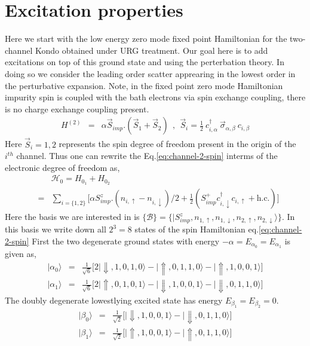 \documentclass[reprint,prb,superscriptaddress]{revtex4-1}
\begin{document}
\section{Excitation properties}
Here we start with the low energy zero mode fixed point Hamiltonian for the two-channel Kondo obtained under URG treatment. Our goal here is to add excitations on top of this ground state and using the perterbation theory. In doing so we consider the leading order scatter apprearing in the lowest order in the perturbative expansion. Note, in the fixed point zero mode Hamiltonian impurity spin is coupled with the bath electrons via spin exchange coupling, there is no charge exchange coupling present. 
\begin{eqnarray}
H^{(2)}&=& \alpha \vec{S}_{imp}.(\vec{S}_1+\vec{S}_2)~~,~~\vec{S}_i =  \frac{1}{2}~ c_{i,\alpha}^{\dagger}~ \vec{\sigma}_{\alpha,\beta}~ c_{i,\beta}
\label{eq:channel-2-spin}
\end{eqnarray}
Here $\vec{S}_i=1,2$ represents the spin degree of freedom present in the origin of the $i^{th}$ channel. Thus one can rewrite the Eq.\eqref{eq:channel-2-spin} interms of the electronic degree of freedom as,
\begin{eqnarray}
&&\mathcal{H}_0= H_{0_1}+H_{0_2} \nonumber\\
&=&\sum_{i=\{1,2\}}\bigg[ \alpha S^z_{imp}. (n_{i,\uparrow}-n_{i,\downarrow})/2 + \frac{1}{2}  ( S_{imp}^{+} c^{\dagger}_{i,\downarrow} c_{i,\uparrow} + \textrm{h.c.}  )\nonumber \bigg]
\end{eqnarray}
Here the basis we are interested in is $\{\mathcal{B}\}=\{|S^z_{imp},n_{1,\uparrow},n_{1,\downarrow},n_{2,\uparrow},n_{2,\downarrow}\rangle \}$. In this basis we write down all $2^3=8$ states of the spin Hamiltonian eq.\eqref{eq:channel-2-spin}
First the two degenerate ground states with energy $-\alpha= E_{\alpha_0}= E_{\alpha_1}$ is given as,
\begin{eqnarray}
|\alpha_0\rangle &=& \frac{1}{\sqrt{6}} \bigg[2|\Downarrow,1,0,1,0\rangle-|\Uparrow,0,1,1,0\rangle-|\Uparrow,1,0,0,1\rangle\bigg] \nonumber\\
|\alpha_1\rangle &=& \frac{1}{\sqrt{6}} \bigg[2|\Uparrow,0,1,0,1\rangle-|\Downarrow,1,0,0,1\rangle-|\Downarrow,0,1,1,0\rangle\bigg] \nonumber
\end{eqnarray}
The doubly degenerate lowestlying excited state has energy $E_{\beta_1}=E_{\beta_2}=0$.
\begin{eqnarray}
|\beta_0\rangle &=& \frac{1}{\sqrt{2}}\bigg[|\Downarrow,1,0,0,1\rangle-|\Downarrow,0,1,1,0\rangle \bigg] \nonumber\\
|\beta_1\rangle &=& \frac{1}{\sqrt{2}} \bigg[ |\Uparrow,1,0,0,1\rangle-|\Uparrow,0,1,1,0\rangle \bigg]
\end{eqnarray}
\end{document}
